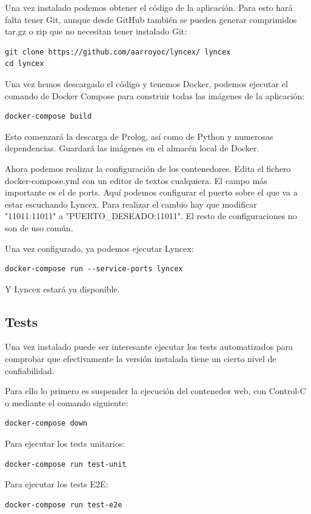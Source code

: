 \documentclass[12pt]{report} %
\begin{document}
Una vez instalado podemos obtener el código de la aplicación. Para esto hará falta tener Git, aunque desde GitHub también se pueden generar comprimidos tar.gz o zip que no necesitan tener instalado Git:
\begin{verbatim}
git clone https://github.com/aarroyoc/lyncex/ lyncex
cd lyncex
\end{verbatim}

Una vez hemos descargado el código y tenemos Docker, podemos ejecutar el comando de Docker Compose para construir todas las imágenes de la aplicación:
\begin{verbatim}
docker-compose build
\end{verbatim}

Esto comenzará la descarga de Prolog, así como de Python y numerosas dependencias. Guardará las imágenes en el almacén local de Docker. 

Ahora podemos realizar la configuración de los contenedores. Edita el fichero docker-compose.yml con un editor de textos cualquiera. El campo más importante es el de ports. Aquí podemos configurar el puerto sobre el que va a estar escuchando Lyncex. Para realizar el cambio hay que modificar "11011:11011" a "PUERTO\_DESEADO:11011". El resto de configuraciones no son de uso común.

Una vez configurado, ya podemos ejecutar Lyncex:
\begin{verbatim}
docker-compose run --service-ports lyncex
\end{verbatim}
Y Lyncex estará ya disponible.

\subsection{Tests}

Una vez instalado puede ser interesante ejecutar los tests automatizados para comprobar que efectivamente la versión instalada tiene un cierto nivel de confiabilidad.

Para ello lo primero es suspender la ejecución del contenedor web, con Control-C o mediante el comando siguiente:
\begin{verbatim}
docker-compose down
\end{verbatim}

Para ejecutar los tests unitarios:
\begin{verbatim}
docker-compose run test-unit
\end{verbatim}

Para ejecutar los tests E2E:
\begin{verbatim}
docker-compose run test-e2e
\end{verbatim}
\end{document}
